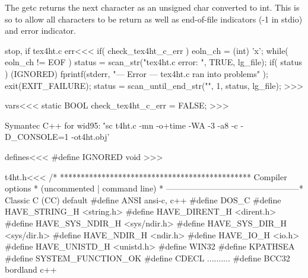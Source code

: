 {The getc returns the next character as an unsigned char converted to int.
This is so to allow all characters to be return as well as end-of-file
indicators (-1 in stdio) and error indicator.







\<stop, if tex4ht.c err\><<<
if( check_tex4ht_c_err ){
   eoln_ch = (int) 'x';
   while( eoln_ch != EOF ) {              
      status = scan_str("tex4ht.c error: ", TRUE, lg_file);
      if( status ){
          (IGNORED) fprintf(stderr,
              "--- Error --- tex4ht.c ran into problems\n"
           );
           exit(EXIT_FAILURE);
      }
      status = scan_until_end_str("", 1, status, lg_file);
}  }
>>>




\<vars\><<<
static BOOL check_tex4ht_c_err = FALSE;
>>>

























Symantec C++ for wid95:
\''sc t4ht.c -mn -o+time -WA -3 -a8 -c -D_CONSOLE=1 -ot4ht.obj'


\<defines\><<<
#define IGNORED void
>>>



\<t4ht.h\><<<
/* **********************************************
    Compiler options                            *
    (uncommented | command line)                *
------------------------------------------------*
       Classic C (CC)             default
#define ANSI                      ansi-c, c++
#define DOS_C
#define HAVE_STRING_H             <string.h>
#define HAVE_DIRENT_H             <dirent.h>
#define HAVE_SYS_NDIR_H           <sys/ndir.h>
#define HAVE_SYS_DIR_H            <sys/dir.h>
#define HAVE_NDIR_H               <ndir.h>
#define HAVE_IO_H                 <io.h>
#define HAVE_UNISTD_H             <unistd.h>
#define WIN32
#define KPATHSEA             
#define SYSTEM_FUNCTION_OK 
#define CDECL                    ..........
#define BCC32                    bordland c++

}
